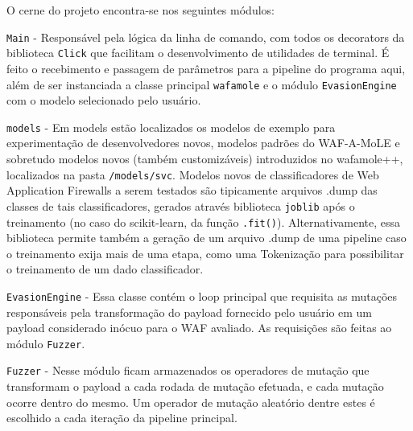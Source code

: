 O cerne do projeto encontra-se nos seguintes módulos:
\begin{alineas}
\item \verb+Main+ - Responsável pela lógica da linha de comando, com todos os decorators da biblioteca \verb+Click+ que facilitam o desenvolvimento de utilidades de terminal. É feito o recebimento e passagem de parâmetros para a pipeline do programa aqui, além de ser instanciada a classe principal \verb+wafamole+ e o módulo \verb+EvasionEngine+ com o modelo selecionado pelo usuário.
\item \verb+models+ - Em models estão localizados os modelos de exemplo para experimentação de desenvolvedores novos, modelos padrões do WAF-A-MoLE e sobretudo modelos novos (também customizáveis) introduzidos no wafamole++, localizados na pasta \verb+/models/svc+. Modelos novos de classificadores de Web Application Firewalls a serem testados são tipicamente arquivos .dump das classes de tais classificadores, gerados através biblioteca \verb+joblib+ após o treinamento (no caso do scikit-learn, da função \verb+.fit()+). Alternativamente, essa biblioteca permite também a geração de um arquivo .dump de uma pipeline caso o treinamento exija mais de uma etapa, como uma Tokenização para possibilitar o treinamento de um dado classificador.
\item \verb+EvasionEngine+ - Essa classe contém o loop principal que requisita as mutações responsáveis pela transformação do payload fornecido pelo usuário em um payload considerado inócuo para o WAF avaliado. As requisições são feitas ao módulo \verb+Fuzzer+.
\item \verb+Fuzzer+ - Nesse módulo ficam armazenados os operadores de mutação que transformam o payload a cada rodada de mutação efetuada, e cada mutação ocorre dentro do mesmo. Um operador de mutação aleatório dentre estes é escolhido a cada iteração da pipeline principal.
\end{alineas}

